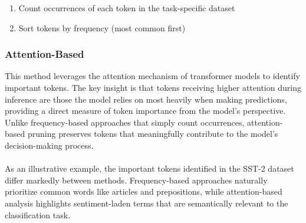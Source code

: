 \documentclass[twocolumn]{article}
\begin{document}
\begin{enumerate}
    \item Count occurrences of each token in the task-specific dataset
    \item Sort tokens by frequency (most common first)
\end{enumerate}
\subsubsection{Attention-Based}
This method leverages the attention mechanism of transformer models to identify important tokens. The key insight is that tokens receiving higher attention during inference are those the model relies on most heavily when making predictions, providing a direct measure of token importance from the model's perspective. Unlike frequency-based approaches that simply count occurrences, attention-based pruning preserves tokens that meaningfully contribute to the model's decision-making process.
\\ \\
As an illustrative example, the important tokens identified in the SST-2 dataset differ markedly between methods. Frequency-based approaches naturally prioritize common words like articles and prepositions, while attention-based analysis highlights sentiment-laden terms that are semantically relevant to the classification task.
\end{document}
